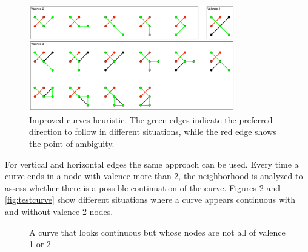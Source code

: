 \documentclass[]{usiinfbachelorproject}
\begin{document}
\begin{figure}[ht]
	\centering
	\includegraphics[width=0.8\textwidth]{img/curvature_heuristics.pdf}
	\caption{Improved curves heuristic. The green edges indicate the preferred direction to follow in different situations, while the red edge shows the point of ambiguity.}
	\label{fig:directions}
\end{figure}

\noindent For vertical and horizontal edges the same approach can be used. Every time a curve ends in a node with valence more than 2, the neighborhood is analyzed to assess whether there is a possible continuation of the curve. Figures \ref{fig:staircurve} and \ref{fig:testcurve} show different situations where a curve appears continuous with and without valence-2 nodes.

\begin{figure}[ht]
	\centering
	\caption{A curve that looks continuous  but whose nodes are not all of valence 1 or 2 .}
	\label{fig:staircurve}
\end{figure}
\end{document}
